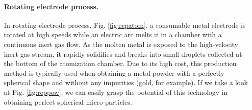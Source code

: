 \paragraph{Rotating electrode process.} In rotating electrode process, Fig. \ref{fig:repatom}, a consumable metal electrode is rotated at high speeds while an electric arc melts it in a chamber with a continuous inert gas flow. As the molten metal is exposed to the high-velocity inert gas stream, it rapidly solidifies and breaks into small droplets collected at the bottom of the atomization chamber. Due to its high cost, this production method is typically used when obtaining a metal powder with a perfectly spherical shape and without any impurities (gold, for example). If we take a look at Fig. \ref{fig:reppow}, we can easily grasp the potential of this technology in obtaining perfect spherical micro-particles.
